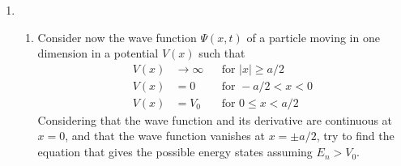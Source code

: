 \documentclass[../psets.tex]{subfiles}
\begin{document}
\begin{enumerate}
\begin{enumerate}
\begin{proof}
            \begin{equation*}
                \ev{\hat{\vec{x}}}{\psi(x,t)} = \frac{9}{25}c_1\e[-2iE_1t/\hbar]+\frac{9}{100}c_3\e[-2iE_3t/\hbar]+\frac{1}{100}c_5\e[-2iE_5t/\hbar]
            \end{equation*}
            This function clearly has a nonzero derivative with respect to time, meaning that the mean value of the position operator  independent of time.\par
            As to the second part of the question, we have that
            \begin{equation*}
                \dv{\Exp{\hat{\vec{p}}}}{t} = \dv{t}(m\dv{\Exp{\hat{\vec{x}}}}{t}) \neq 0
            \end{equation*}
            Therefore, the mean value of the momentum operator  independent of time, either.
        \end{proof}
        \item Would the result of part (d) be different if we replaced $\psi_3$ by $\psi_2$ in Eq. \ref{eqn:PS2E5}?
        \begin{proof}
            If we replaced $\psi_3$ by $\psi_2$, then we would additionally have
            \begin{align*}
                \mel{\psi_1}{\hat{\vec{x}}}{\psi_2} &\neq 0&
                \mel{\psi_2}{\hat{\vec{x}}}{\psi_5} &\neq 0
            \end{align*}
            However, 
        \end{proof}
    \end{enumerate}
    \pagebreak
    \item 
    \begin{enumerate}
        \item Consider now the wave function $\Psi(x,t)$ of a particle moving in one dimension in a potential $V(x)$ such that
        \begin{equation}
            \begin{aligned}
                V(x) &\to\infty && \text{for }|x|\geq a/2\\
                V(x) &= 0       && \text{for }-a/2<x<0\\
                V(x) &= V_0     && \text{for }0\leq x<a/2
            \end{aligned}
        \end{equation}
        Considering that the wave function and its derivative are continuous at $x=0$, and that the wave function vanishes at $x=\pm a/2$, try to find the equation that gives the possible energy states assuming $E_n>V_0$.\par

\end{enumerate}
\end{enumerate}
\end{document}
